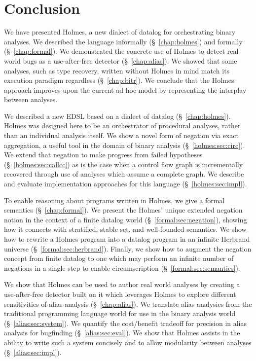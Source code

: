 \chapter{Conclusion}
\label{sec:conc}
We have presented Holmes, a new dialect of datalog for orchestrating binary analyses.
We described the language informally (\S~\ref{chap:holmes}) and formally (\S~\ref{chap:formal}).
We demonstrated the concrete use of Holmes to detect real-world bugs as a use-after-free detector (\S~\ref{chap:alias}).
We showed that some analyses, such as type recovery, written without Holmes in mind match its execution paradigm regardless (\S~\ref{chap:bitr}).
We conclude that the Holmes approach improves upon the current ad-hoc model by representing the interplay between analyses.

We described a new EDSL based on a dialect of datalog (\S~\ref{chap:holmes}).
Holmes was designed here to be an orchestrator of procedural analyses, rather than an individual analysis itself.
We show a novel form of negation via exact aggregation, a useful tool in the domain of binary analysis (\S~\ref{holmes:sec:circ}).
We extend that negation to make progress from failed hypotheses (\S~\ref{holmes:sec:callcc}) as is the case when a control flow graph is incrementally recovered through use of analyses which assume a complete graph.
We describe and evaluate implementation approaches for this language (\S~\ref{holmes:sec:impl}).

To enable reasoning about programs written in Holmes, we give a formal semantics (\S~\ref{chap:formal}).
We present the Holmes' unique extended negation notion in the context of a finite datalog world (\S~\ref{formal:sec:negation}), showing how it connects with stratified, stable set, and well-founded semantics. 
We show how to rewrite a Holmes program into a datalog program in an infinite Herbrand universe (\S~\ref{formal:sec:herbrand}).
Finally, we show how to augment the negation concept from finite datalog to one which may perform an infinite number of negations in a single step to enable circumscription (\S~\ref{formal:sec:semantics}).

We show that Holmes can be used to author real world analyses by creating a use-after-free detector built on it which leverages Holmes to explore different sensitivities of alias analysis (\S~\ref{chap:alias}).
We translate alias analysies from the traditional programming language world for use in the binary analysis world (\S~\ref{alias:sec:system}).
We quantify the cost/benefit tradeoff for precision in alias analysis for bugfinding (\S~\ref{alias:sec:eval}).
We show that Holmes assists in the ability to write such a system concisely and to allow modularity between analyses (\S~\ref{alias:sec:impl}).


